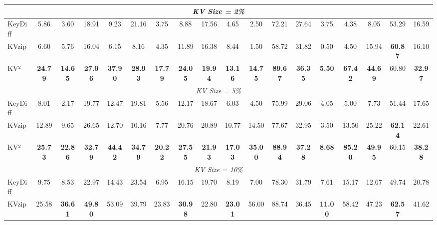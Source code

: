 \documentclass[11pt]{article}
\begin{document}
\begin{table}[htbp]
\begin{tabular}{l|ccc|ccc|ccc|ccc|cc|cc|c}
\midrule
\multicolumn{18}{c}{\textit{KV Size = 2\%}} \\
\midrule

KeyDiff
    & 5.86 & 3.60 & 18.91
    & 9.23 & 21.16 & 3.75
    & 8.88 & 17.56 & 4.65
    & 2.50 & 72.21 & 27.64
    & 3.75 & 4.38
    & 8.05 & 53.29
    & 16.59 \\

KVzip
    & 6.60 & 5.76 & 16.04
    & 6.15 & 8.16 & 4.35
    & 11.89 & 16.38 & 8.44
    & 1.50 & 58.72 & 31.82
    & 0.50 & 4.50
    & 15.94 & \textbf{60.87}
    & 16.10 \\

KV²
    & \textbf{24.79} & \textbf{14.65} & \textbf{27.06}
    & \textbf{37.90} & \textbf{28.93} & \textbf{17.79}
    & \textbf{24.05} & \textbf{19.94} & \textbf{13.16}
    & \textbf{14.75} & \textbf{89.67} & \textbf{36.35}
    & \textbf{5.50} & \textbf{67.42}
    & \textbf{44.69} & 60.80
    & \textbf{32.97} \\

\midrule
\multicolumn{18}{c}{\textit{KV Size = 5\%}} \\
\midrule

KeyDiff
    & 8.01 & 2.17 & 19.77
    & 12.47 & 19.81 & 5.56
    & 12.17 & 18.67 & 6.03
    & 4.50 & 75.99 & 29.06
    & 4.05 & 5.00
    & 7.73 & 51.44
    & 17.65 \\

KVzip
    & 12.89 & 9.65 & 26.65
    & 12.70 & 10.16 & 7.77
    & 20.76 & 20.89 & 10.77
    & 14.50 & 77.67 & 32.95
    & 3.50 & 13.50
    & 25.22 & \textbf{62.14}
    & 22.61 \\

KV²
    & \textbf{25.73} & \textbf{22.86} & \textbf{32.79}
    & \textbf{44.42} & \textbf{34.79} & \textbf{20.22}
    & \textbf{27.55} & \textbf{21.93} & \textbf{17.03}
    & \textbf{35.00} & \textbf{88.94} & \textbf{37.28}
    & \textbf{8.68} & \textbf{85.20}
    & \textbf{49.95} & 60.15
    & \textbf{38.28} \\

\midrule
\multicolumn{18}{c}{\textit{KV Size = 10\%}} \\
\midrule

KeyDiff
    & 9.75 & 8.53 & 22.97
    & 14.43 & 23.54 & 6.95
    & 16.15 & 19.70 & 8.19
    & 7.00 & 78.30 & 31.79
    & 7.61 & 15.17
    & 12.67 & 49.74
    & 20.78 \\

KVzip
    & 25.58 & \textbf{36.61}
    & \textbf{49.80}
    & 53.09 & 39.79 & 23.83
    & \textbf{30.98} & 22.80 & \textbf{23.01}
    & 56.00 & 88.74 & 36.45
    & \textbf{11.00} & 58.42
    & 47.23 & \textbf{62.57}
    & 41.62 \\


\end{tabular}
\end{table}
\end{document}
